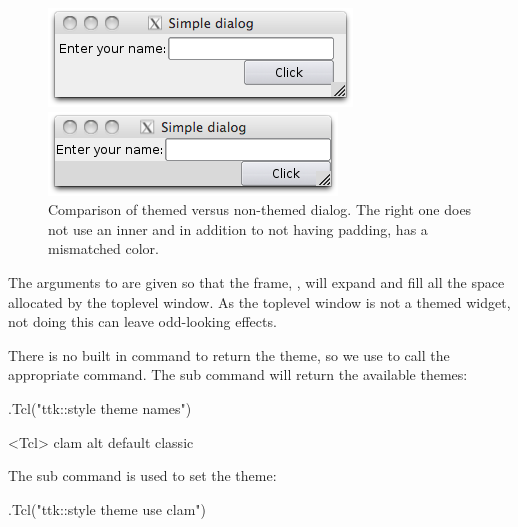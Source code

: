\begin{figure}
  \centering
  \begin{minipage}[c]{.45\linewidth}
    \includegraphics[width=\textwidth]{fig-tcltk-themed-dialog.png}    
  \end{minipage}\quad
  \begin{minipage}[c]{.45\linewidth}
   \includegraphics[width=\textwidth]{fig-tcltk-non-themed-dialog.png}
 \end{minipage}
 \caption{Comparison of themed versus non-themed dialog. The right
    one does not use an inner  and in addition to not
    having padding, has a mismatched color.}
  \label{fig:tcltk-compare-themed-non-themed}
\end{figure}


The arguments to  are given so that the frame, ,
will expand and fill all the space allocated by the toplevel
window. As the toplevel window is not a themed widget, not doing this
can leave odd-looking effects.

There is no built in command to return the theme, so we use
 to call the appropriate \TCL\/ command. The 
sub command will return the available themes:

\begin{Schunk}
\begin{Sinput}
 .Tcl("ttk::style theme names")
\end{Sinput}
\begin{Soutput}
<Tcl> clam alt default classic 
\end{Soutput}
\end{Schunk}
%
The  sub command is used to set the theme:
\begin{Schunk}
\begin{Sinput}
 .Tcl("ttk::style theme use clam")
\end{Sinput}
\end{Schunk}

